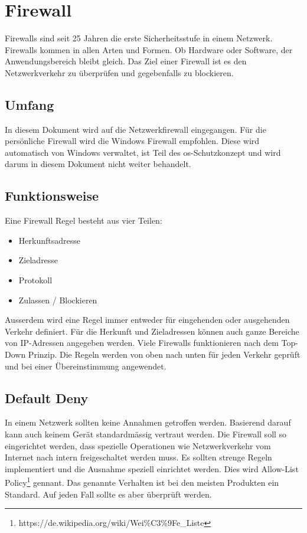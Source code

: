 \chapter{Firewall}
Firewalls sind seit 25 Jahren die erste Sicherheitsstufe in einem Netzwerk.
Firewalls kommen in allen Arten und Formen.
Ob Hardware oder Software, der Anwendungsbereich bleibt gleich.
Das Ziel einer Firewall ist es den Netzwerkverkehr zu überprüfen und gegebenfalls zu blockieren.


\section{Umfang}
In diesem Dokument wird auf die Netzwerkfirewall eingegangen.
Für die persönliche Firewall wird die Windows Firewall empfohlen.
Diese wird automatisch von Windows verwaltet, ist Teil des \acrshort{os}-Schutzkonzept und wird darum in diesem Dokument nicht weiter behandelt.

\section{Funktionsweise}
Eine Firewall Regel besteht aus vier Teilen:
\begin{itemize}
    \item Herkunftsadresse
    \item Zieladresse
    \item Protokoll
    \item Zulassen / Blockieren
\end{itemize}

Ausserdem wird eine Regel immer entweder für eingehenden oder ausgehenden Verkehr definiert.
Für die Herkunft und Zieladressen können auch ganze Bereiche von IP-Adressen angegeben werden.
Viele Firewalls funktionieren nach dem Top-Down Prinzip. 
Die Regeln werden von oben nach unten für jeden Verkehr geprüft und bei einer Übereinstimmung angewendet.

\section{Default Deny}
In einem Netzwerk sollten keine Annahmen getroffen werden.
Basierend darauf kann auch keinem Gerät standardmässig vertraut werden.
Die Firewall soll so eingerichtet werden, dass spezielle Operationen wie Netzwerkverkehr vom Internet nach intern freigeschaltet werden muss.
Es sollten strenge Regeln implementiert und die Ausnahme speziell einrichtet werden.
Dies wird Allow-List Policy\footnote{https://de.wikipedia.org/wiki/Wei\%C3\%9Fe\_Liste} gennant.
Das genannte Verhalten ist bei den meisten Produkten ein Standard.
Auf jeden Fall sollte es aber überprüft werden.\\

